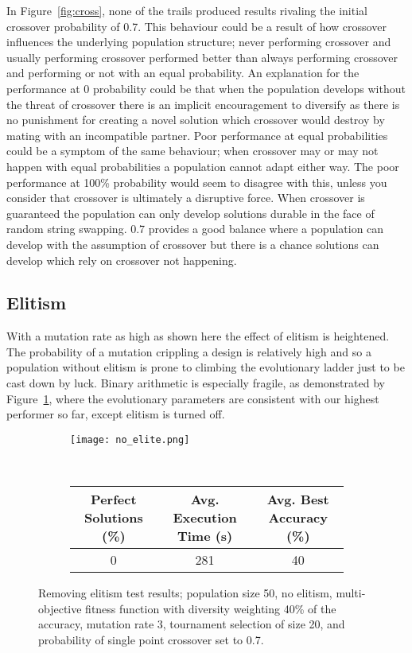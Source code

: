In Figure~\ref{fig:cross}, none of the trails produced results rivaling the
initial crossover probability
of 0.7. This behaviour could be a result of how crossover influences the underlying
population structure; never performing crossover and usually performing crossover
performed better than always performing crossover and performing or not with an equal
probability. An explanation for the performance at 0 probability could be that
when the population develops without the threat of crossover there is an implicit
encouragement to diversify as there is no punishment for creating a novel solution
which crossover would destroy by mating with an incompatible partner. Poor performance
at equal probabilities could be a symptom of the same behaviour; when crossover
may or may not happen with equal probabilities a population cannot adapt either way.
The poor performance at 100\% probability would seem to disagree with this, unless you
consider that crossover is ultimately a disruptive force. When crossover is guaranteed
the population can only develop solutions durable in the face of random string swapping.
0.7 provides a good balance where a population can develop with the assumption of
crossover but there is a chance solutions can develop which rely on crossover not
happening.

\subsection{Elitism \label{ss:elitism}}
With a mutation rate as high as shown here the effect of elitism is heightened.
The probability of a mutation crippling a design is relatively high and so a population
without elitism is prone to climbing the evolutionary ladder just to be cast
down by luck. Binary arithmetic is especially fragile, as demonstrated by Figure~\ref{fig:no_elitism},
where the evolutionary parameters are consistent with our highest performer so far, except
elitism is turned off.

\begin{figure}
	\centering
	\begin{subfigure}[ht]{0.49\textwidth}
		\texttt{[image: no\_elite.png]}
		\vspace{1em}
	\end{subfigure}
	~
	\begin{subfigure}[ht]{\textwidth}
		\centering
		\begin{tabular}{ccc}
			\toprule
			\bfseries{Perfect Solutions (\%)} &
			\bfseries{Avg. Execution Time (s)} & \bfseries{Avg. Best Accuracy (\%)}\\
			\midrule
			0 & 281 & 40\\
			\bottomrule
		\end{tabular}
	\end{subfigure}

	\caption[Removing elitism test results]{Removing elitism test results;
	population size 50, no elitism, multi-objective fitness function with
	diversity weighting 40\% of the accuracy, mutation rate 3, tournament
	selection of size 20, and probability of single point crossover set to 0.7.}
	\label{fig:no_elitism}
\end{figure}

